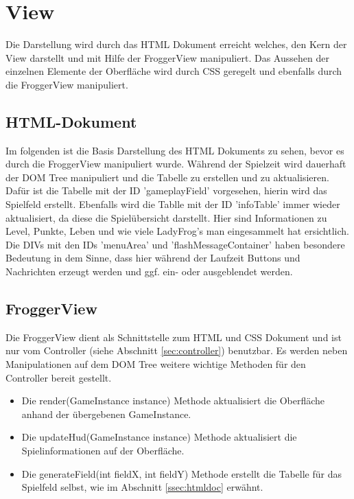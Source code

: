 \documentclass[a4paper,10pt]{report}
\begin{document}
    \section{View}
    {
    	\label{sec:view}
    	Die Darstellung wird durch das HTML Dokument erreicht welches, den Kern der View darstellt und mit Hilfe der FroggerView manipuliert.
    	Das Aussehen der einzelnen Elemente der Oberfläche wird durch CSS geregelt und ebenfalls durch die FroggerView manipuliert.
    	
		\subsection{HTML-Dokument}
		{
			\label{ssec:htmldoc}
			Im folgenden ist die Basis Darstellung des HTML Dokuments zu sehen, bevor es durch die FroggerView manipuliert wurde.
			Während der Spielzeit wird dauerhaft der DOM Tree manipuliert und die Tabelle zu erstellen und zu aktualisieren.
			Dafür ist die Tabelle mit der ID 'gameplayField' vorgesehen, hierin wird das Spielfeld erstellt.
			Ebenfalls wird die Tablle mit der ID 'infoTable' immer wieder aktualisiert, da diese die Spielübersicht darstellt.
			Hier sind Informationen zu Level, Punkte, Leben und wie viele LadyFrog's man eingesammelt hat ersichtlich.	
			\newline \newline
			\noindent
			Die DIVs mit den IDs 'menuArea' und 'flashMessageContainer' haben besondere Bedeutung in dem Sinne, dass hier während der Laufzeit
			Buttons und Nachrichten erzeugt werden und ggf. ein- oder ausgeblendet werden.		
			\newpage
				
		}
		\newpage
		\subsection{FroggerView}
		{
			Die FroggerView dient als Schnittstelle zum HTML und CSS Dokument und ist nur vom Controller (siehe Abschnitt \ref{sec:controller}) benutzbar.		
			Es werden neben Manipulationen auf dem DOM Tree weitere wichtige Methoden für den Controller bereit gestellt.
			
			 \begin{itemize}
			 	\item Die render(GameInstance instance) Methode aktualisiert die Oberfläche anhand der übergebenen GameInstance.
			 	\item Die updateHud(GameInstance instance) Methode aktualisiert die Spielinformationen auf der Oberfläche.
			 	\item Die generateField(int fieldX, int fieldY) Methode erstellt die Tabelle für das Spielfeld selbst, wie im Abschnitt \ref{ssec:htmldoc} erwähnt.
			 \end{itemize}
			
}}
\end{document}
